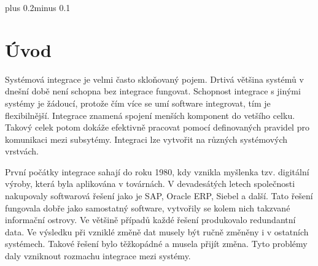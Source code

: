 \documentclass[11pt,twoside,a4paper]{book}
\begin{document}
\lstlistoflistings 



\mainbodystarts
\normalfont
{}\baselineskip plus 0.2\baselineskip minus 0.1\baselineskip



% 
% 

% 
\chapter{Úvod} 
Systémová integrace je velmi často skloňovaný pojem. Drtivá většina systémů v dnešní době
není schopna bez integrace fungovat. Schopnost integrace s jinými systémy je
žádoucí, protože čím více se umí software integrovat, tím je flexibilnější. Integrace znamená spojení
menších komponent do vetšího celku. Takový celek potom dokáže efektivně pracovat pomocí
definovaných pravidel pro komunikaci mezi subsytémy. Integraci lze vytvořit na různých
systémových vrstvách.

První počátky integrace sahají do roku 1980, kdy vznikla myšlenka tzv. digitální výroby, která
byla aplikována v továrnách. V devadesátých letech společnosti nakupovaly softwarová řešení
jako je SAP, Oracle ERP, Siebel a další. Tato řešení fungovala dobře jako samostatný
software, vytvořily se kolem nich takzvané informační ostrovy. Ve většině případů každé
řešení produkovalo redundantní data. Ve výsledku při vzniklé změně dat musely být ručně
změněny i v ostatních systémech. Takové řešení bylo těžkopádné a musela přijít změna. Tyto
problémy daly vzniknout rozmachu integrace mezi systémy.
\end{document}
